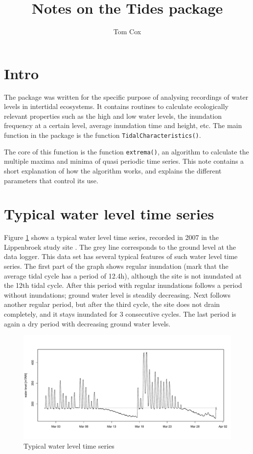 \documentclass[10pt,a4wide]{article}
\author{Tom Cox}
\title{Notes on the Tides package}
\begin{document}
\maketitle
\section{Intro}
The package was written for the specific purpose of analysing recordings of water levels in intertidal ecosystems. It contains routines to calculate ecologically relevant properties such as the high and low water levels, the inundation frequency at a certain level, average inundation time and height, etc. The main function in the package is the function \texttt{TidalCharacteristics()}.

The core of this function is the function \texttt{extrema()}, an algorithm to calculate the multiple maxima and minima of quasi periodic time series. This note contains a short explanation of how the algorithm works, and explains the different parameters that control its use.

\section{Typical water level time series}
Figure \ref{Fig1} shows a typical water level time series, recorded in 2007 in the Lippenbroek study site \citep{Cox2006, Maris2007}. The grey line corresponds to the ground level at the data logger. This data set has several typical features of such water level time series. The first part of the graph shows regular inundation (mark that the average tidal cycle has a period of 12.4h), although the site is not inundated at the 12th tidal cycle. After this period with regular inundations follows a period without inundations; ground water level is steadily decreasing. Next follows another regular period, but after the third cycle, the site does not drain completely, and it stays inundated for 3 consecutive cycles. The last period is again a dry period with decreasing ground water levels.

\begin{figure}[h]
\begin{center}
\includegraphics[width=\textwidth]{./TideFig1}
\end{center}
\caption{Typical water level time series} 
\label{Fig1}
\end{figure}
\end{document}
